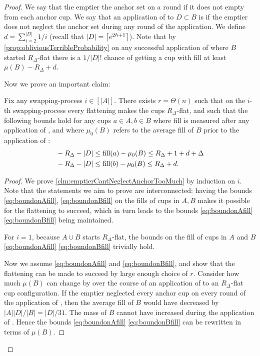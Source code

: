 \begin{proof}
We say that the emptier  the anchor set on a round
if it does not empty from each anchor cup. We say that an
application of \randalg to $D\subset B$ is  if
the emptier does not neglect the anchor set during any round of
the application. We define $d = \sum_{i=2}^{|D|} 1/i$ (recall
that $|D| = \left\lceil e^{2h+1} \right\rceil$). Note that by
\cref{prop:obliviousTerribleProbability} on any successful
application of \randalg where $B$ started $R_\Delta$-flat there
is a $1/|D|!$ chance of getting a cup with fill at least $\mu(B)
-R_\Delta + d$. 

Now we prove an important claim:
\begin{clm}
  \label{clm:emptierCantNeglectAnchorTooMuch}
  Fix any swapping-process $i \in [|A|]$. 
  There exists $r = \Theta(n)$ such that on the $i$-th swapping-process every
  flattening makes the cups $R_\Delta$-flat, and such that the
  following bounds hold for any cups $a\in A, b\in B$ where fill
  is measured after any application of \randalg, and where
  $\mu_0(B)$ refers to the average fill of $B$ prior to the
  application of \randalg:
  \begin{align}
    & - R_\Delta - |D| \le \operatorname{\textnormal{fill}}(a) -\mu_0(B) \le R_\Delta + 1 + d + \Delta \label{eq:boundonAfill}\\
    & - R_\Delta - |D| \le \operatorname{\textnormal{fill}}(b) - \mu_0(B) \le R_\Delta + d. \label{eq:boundonBfill}
  \end{align}

\end{clm}
\begin{proof}

  We prove \cref{clm:emptierCantNeglectAnchorTooMuch} by
  induction on $i$. Note that the statements we aim to prove are
  interconnected: having the bounds \eqref{eq:boundonAfill},
  \eqref{eq:boundonBfill} on the fills of cups in $A, B$ makes it
  possible for the flattening to succeed, which in turn leads to
  the bounds \eqref{eq:boundonAfill} \eqref{eq:boundonBfill}
  being maintained.

  For $i=1$, because $A\cup B$ starts $R_\Delta$-flat, the bounds
  on the fill of cups in $A$ and $B$ \eqref{eq:boundonAfill}
  \eqref{eq:boundonBfill} trivially hold.

  Now we assume \eqref{eq:boundonAfill} and
  \eqref{eq:boundonBfill}, and show that the flattening can be
  made to succeed by large enough choice of $r$. 
  Consider how much $\mu(B)$ can change by over the course of an
  application of \randalg to an $R_\Delta$-flat cup configuration.
  If the emptier neglected every anchor cup on every round of the
  application of \randalg, then the average fill of $B$ would have
  decreased by $|A||D|/|B| = |D|/31$. The mass of $B$ cannot have
  increased during the application of \randalg.
  Hence the bounds \eqref{eq:boundonAfill}
  \eqref{eq:boundonBfill} can be rewritten in terms of $\mu(B)$.


\end{proof}
\end{proof}
